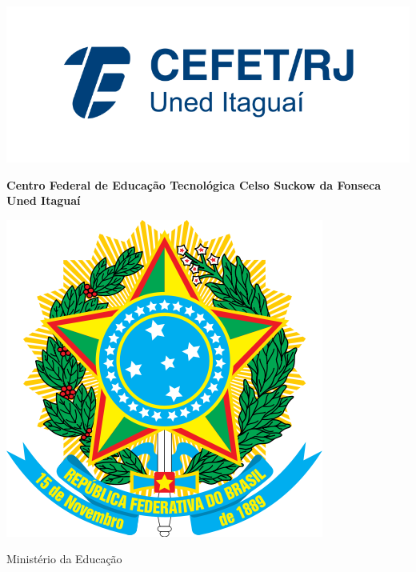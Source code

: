 \documentclass[a4paper,11pt]{article}
\begin{document}
\pagestyle{empty}

\begin{minipage}{6cm} %
\includegraphics[scale=.8, trim={0.5cm 0.5cm 0.5cm 0.5cm}, clip]{horiz_azul_itaguai.png}
\end{minipage}
\begin{minipage}{7cm}
\begin{center}
\begin{footnotesize}
\sf \textbf{Centro Federal de Educação Tecnológica Celso Suckow da Fonseca}\\
\textbf{Uned Itaguaí}\\
\end{footnotesize}
\end{center}
\end{minipage}
\begin{minipage}{4cm}
\centering
\includegraphics[scale=0.12]{meBrasil.png}\\
\begin{scriptsize}
\textsf{Ministério da Educação}
\end{scriptsize}
\end{minipage}
\end{document}
